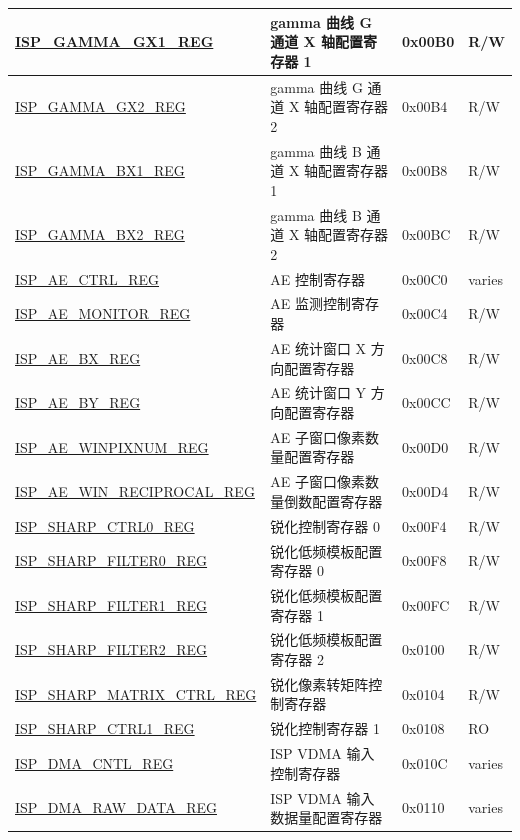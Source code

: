 \begin{longtable}{ | p{6cm} | p{7.2cm} | p{1.3cm} | p{1cm} | }
\hyperref[regdesc:ISPGAMMAGX1REG]{ISP\_GAMMA\_GX1\_REG} & gamma 曲线 G 通道 X 轴配置寄存器 1 & 0x00B0 & R/W \\ \hline
\hyperref[regdesc:ISPGAMMAGX2REG]{ISP\_GAMMA\_GX2\_REG} & gamma 曲线 G 通道 X 轴配置寄存器 2 & 0x00B4 & R/W \\ \hline
\hyperref[regdesc:ISPGAMMABX1REG]{ISP\_GAMMA\_BX1\_REG} & gamma 曲线 B 通道 X 轴配置寄存器 1 & 0x00B8 & R/W \\ \hline
\hyperref[regdesc:ISPGAMMABX2REG]{ISP\_GAMMA\_BX2\_REG} & gamma 曲线 B 通道 X 轴配置寄存器 2 & 0x00BC & R/W \\ \hline
\hyperref[regdesc:ISPAECTRLREG]{ISP\_AE\_CTRL\_REG} & AE 控制寄存器 & 0x00C0 & varies \\ \hline
\hyperref[regdesc:ISPAEMONITORREG]{ISP\_AE\_MONITOR\_REG} & AE 监测控制寄存器 & 0x00C4 & R/W \\ \hline
\hyperref[regdesc:ISPAEBXREG]{ISP\_AE\_BX\_REG} & AE 统计窗口 X 方向配置寄存器 & 0x00C8 & R/W \\ \hline
\hyperref[regdesc:ISPAEBYREG]{ISP\_AE\_BY\_REG} & AE 统计窗口 Y 方向配置寄存器 & 0x00CC & R/W \\ \hline
\hyperref[regdesc:ISPAEWINPIXNUMREG]{ISP\_AE\_WINPIXNUM\_REG} & AE 子窗口像素数量配置寄存器 & 0x00D0 & R/W \\ \hline
\hyperref[regdesc:ISPAEWINRECIPROCALREG]{ISP\_AE\_WIN\_RECIPROCAL\_REG} & AE 子窗口像素数量倒数配置寄存器 & 0x00D4 & R/W \\ \hline
\hyperref[regdesc:ISPSHARPCTRL0REG]{ISP\_SHARP\_CTRL0\_REG} & 锐化控制寄存器 0 & 0x00F4 & R/W \\ \hline
\hyperref[regdesc:ISPSHARPFILTER0REG]{ISP\_SHARP\_FILTER0\_REG} & 锐化低频模板配置寄存器 0 & 0x00F8 & R/W \\ \hline
\hyperref[regdesc:ISPSHARPFILTER1REG]{ISP\_SHARP\_FILTER1\_REG} & 锐化低频模板配置寄存器 1 & 0x00FC & R/W \\ \hline
\hyperref[regdesc:ISPSHARPFILTER2REG]{ISP\_SHARP\_FILTER2\_REG} & 锐化低频模板配置寄存器 2 & 0x0100 & R/W \\ \hline
\hyperref[regdesc:ISPSHARPMATRIXCTRLREG]{ISP\_SHARP\_MATRIX\_CTRL\_REG} & 锐化像素转矩阵控制寄存器 & 0x0104 & R/W \\ \hline
\hyperref[regdesc:ISPSHARPCTRL1REG]{ISP\_SHARP\_CTRL1\_REG} & 锐化控制寄存器 1 & 0x0108 & RO \\ \hline
\hyperref[regdesc:ISPDMACNTLREG]{ISP\_DMA\_CNTL\_REG} & ISP VDMA 输入控制寄存器 & 0x010C & varies \\ \hline
\hyperref[regdesc:ISPDMARAWDATAREG]{ISP\_DMA\_RAW\_DATA\_REG} & ISP VDMA 输入数据量配置寄存器 & 0x0110 & varies \\ \hline

\end{longtable}
